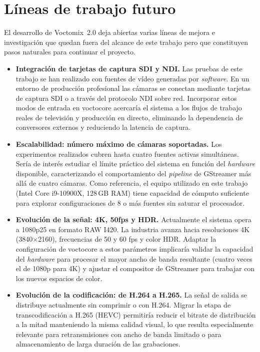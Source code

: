 \section{Líneas de trabajo futuro}
\label{sec:lineas_futuras}

El desarrollo de Voctomix~2.0 deja abiertas varias líneas de mejora e investigación
que quedan fuera del alcance de este trabajo pero que constituyen pasos naturales
para continuar el proyecto.

\begin{itemize}

  \item \textbf{Integración de tarjetas de captura SDI y NDI.}
  Las pruebas de este trabajo se han realizado con fuentes de vídeo generadas por
  \textit{software}. En un entorno de producción profesional las cámaras se conectan mediante
  tarjetas de captura SDI o a través del protocolo NDI sobre red. Incorporar estos
  modos de entrada en voctocore acercaría el sistema a los flujos de trabajo reales
  de televisión y producción en directo, eliminando la dependencia de conversores
  externos y reduciendo la latencia de captura.

  \item \textbf{Escalabilidad: número máximo de cámaras soportadas.}
  Los experimentos realizados cubren hasta cuatro fuentes activas simultáneas. Sería
  de interés estudiar el límite práctico del sistema en función del \textit{hardware} disponible,
  caracterizando el comportamiento del \textit{pipeline} de GStreamer más allá de cuatro cámaras.
  Como referencia, el equipo utilizado en este trabajo (Intel Core i9-10900X,
  128\,GB RAM) tiene capacidad de cómputo suficiente para explorar configuraciones
  de 8 o más fuentes sin saturar el procesador.

  \item \textbf{Evolución de la señal: 4K, 50fps y HDR.}
  Actualmente el sistema opera a 1080p25 en formato RAW I420. La industria avanza
  hacia resoluciones 4K (3840$\times$2160), frecuencias de 50 y 60 fps y color HDR.
  Adaptar la configuración de voctocore a estos parámetros implicaría validar la
  capacidad del \textit{hardware} para procesar el mayor ancho de banda resultante (cuatro
  veces el de 1080p para 4K) y ajustar el compositor de GStreamer para trabajar con
  los nuevos espacios de color.

  \item \textbf{Evolución de la codificación: de H.264 a H.265.}
  La señal de salida se distribuye actualmente sin comprimir o con H.264.
  Migrar la etapa de transcodificación a H.265 (HEVC) permitiría reducir el
  bitrate de distribución a la mitad manteniendo la misma calidad visual,
  lo que resulta especialmente relevante para retransmisiones con ancho de
  banda limitado o para almacenamiento de larga duración de las grabaciones.


\end{itemize}
